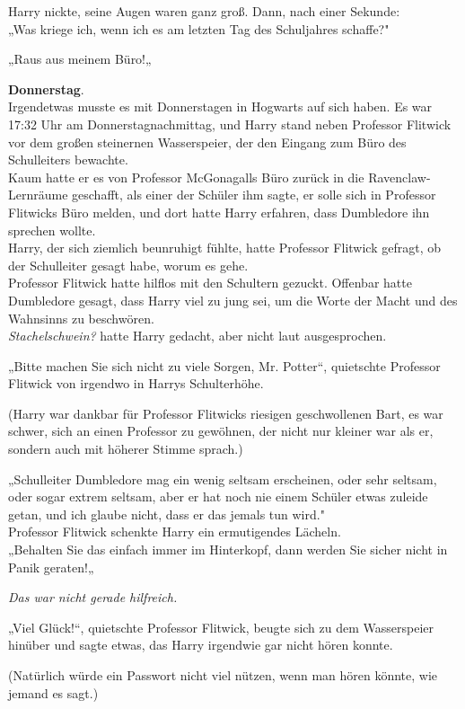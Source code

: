 {Harry nickte, seine Augen waren ganz groß. Dann, nach einer Sekunde:\\ „Was kriege ich, wenn ich es am letzten Tag des Schuljahres schaffe?"

„Raus aus meinem Büro!„

\textbf{Donnerstag}.\\ Irgendetwas musste es mit Donnerstagen in Hogwarts auf sich haben. Es war 17:32 Uhr am Donnerstagnachmittag, und Harry stand neben Professor Flitwick vor dem großen steinernen Wasserspeier, der den Eingang zum Büro des Schulleiters bewachte.\\ Kaum hatte er es von Professor McGonagalls Büro zurück in die Ravenclaw-Lernräume geschafft, als einer der Schüler ihm sagte, er solle sich in Professor Flitwicks Büro melden, und dort hatte Harry erfahren, dass Dumbledore ihn sprechen wollte.\\ Harry, der sich ziemlich beunruhigt fühlte, hatte Professor Flitwick gefragt, ob der Schulleiter gesagt habe, worum es gehe.\\ Professor Flitwick hatte hilflos mit den Schultern gezuckt. Offenbar hatte Dumbledore gesagt, dass Harry viel zu jung sei, um die Worte der Macht und des Wahnsinns zu beschwören.\\ \emph{Stachelschwein?} hatte Harry gedacht, aber nicht laut ausgesprochen.

„Bitte machen Sie sich nicht zu viele Sorgen, Mr. Potter“, quietschte Professor Flitwick von irgendwo in Harrys Schulterhöhe.

(Harry war dankbar für Professor Flitwicks riesigen geschwollenen Bart, es war schwer, sich an einen Professor zu gewöhnen, der nicht nur kleiner war als er, sondern auch mit höherer Stimme sprach.)

„Schulleiter Dumbledore mag ein wenig seltsam erscheinen, oder sehr seltsam, oder sogar extrem seltsam, aber er hat noch nie einem Schüler etwas zuleide getan, und ich glaube nicht, dass er das jemals tun wird."\\ Professor Flitwick schenkte Harry ein ermutigendes Lächeln.\\ „Behalten Sie das einfach immer im Hinterkopf, dann werden Sie sicher nicht in Panik geraten!„

\emph{Das war nicht gerade hilfreich.}

„Viel Glück!“, quietschte Professor Flitwick, beugte sich zu dem Wasserspeier hinüber und sagte etwas, das Harry irgendwie gar nicht hören konnte.

(Natürlich würde ein Passwort nicht viel nützen, wenn man hören könnte, wie jemand es sagt.)

}

